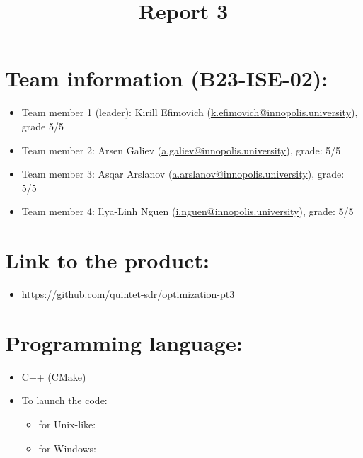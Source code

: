 \documentclass{article}
\title{\textbf{Report 3}}
\author{}
\date{}
\begin{document}
\maketitle

\thispagestyle{fancy}

\section*{Team information (B23-ISE-02):}
\begin{itemize}
    \item Team member 1 (leader): Kirill Efimovich (\href{mailto:k.efimovich@innopolis.university}{k.efimovich@innopolis.university}), grade 5/5
    \item Team member 2: Arsen Galiev (\href{mailto:a.galiev@innopolis.university}{a.galiev@innopolis.university}), grade: 5/5
    \item Team member 3: Asqar Arslanov (\href{mailto:a.arslanov@innopolis.university}{a.arslanov@innopolis.university}), grade: 5/5
    \item Team member 4: Ilya-Linh Nguen (\href{mailto:i.nguen@innopolis.university}{i.nguen@innopolis.university}), grade: 5/5
\end{itemize}

\section*{Link to the product:}

\begin{itemize}
    \item \url{https://github.com/quintet-sdr/optimization-pt3}
\end{itemize}

\section*{Programming language:}

\begin{itemize}
    \item C++ (CMake)
    \item To launch the code:
          \begin{itemize}
              \item for Unix-like:  \\
              \item for Windows: 
          \end{itemize}
\end{itemize}
\end{document}
